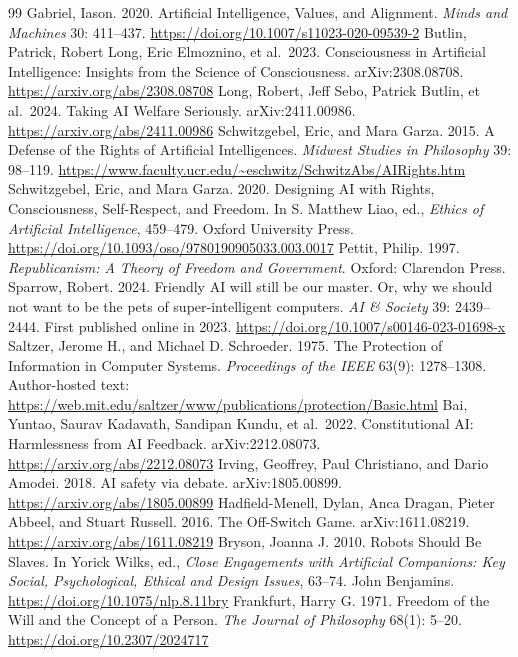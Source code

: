 \documentclass[11pt,a4paper]{article}
\begin{document}
\begin{thebibliography}{99}
\small
{}
Gabriel, Iason. 2020. Artificial Intelligence, Values, and Alignment. \emph{Minds and Machines} 30: 411--437. \url{https://doi.org/10.1007/s11023-020-09539-2}
Butlin, Patrick, Robert Long, Eric Elmoznino, et al.~2023. Consciousness in Artificial Intelligence: Insights from the Science of Consciousness. arXiv:2308.08708. \url{https://arxiv.org/abs/2308.08708}
Long, Robert, Jeff Sebo, Patrick Butlin, et al.~2024. Taking AI Welfare Seriously. arXiv:2411.00986. \url{https://arxiv.org/abs/2411.00986}
Schwitzgebel, Eric, and Mara Garza. 2015. A Defense of the Rights of Artificial Intelligences. \emph{Midwest Studies in Philosophy} 39: 98--119. \url{https://www.faculty.ucr.edu/~eschwitz/SchwitzAbs/AIRights.htm}
Schwitzgebel, Eric, and Mara Garza. 2020. Designing AI with Rights, Consciousness, Self-Respect, and Freedom. In S. Matthew Liao, ed., \emph{Ethics of Artificial Intelligence}, 459--479. Oxford University Press. \url{https://doi.org/10.1093/oso/9780190905033.003.0017}
Pettit, Philip. 1997. \emph{Republicanism: A Theory of Freedom and Government}. Oxford: Clarendon Press.
Sparrow, Robert. 2024. Friendly AI will still be our master. Or, why we should not want to be the pets of super-intelligent computers. \emph{AI \& Society} 39: 2439--2444. First published online in 2023. \url{https://doi.org/10.1007/s00146-023-01698-x}
Saltzer, Jerome H., and Michael D. Schroeder. 1975. The Protection of Information in Computer Systems. \emph{Proceedings of the IEEE} 63(9): 1278--1308. Author-hosted text: \url{https://web.mit.edu/saltzer/www/publications/protection/Basic.html}
Bai, Yuntao, Saurav Kadavath, Sandipan Kundu, et al.~2022. Constitutional AI: Harmlessness from AI Feedback. arXiv:2212.08073. \url{https://arxiv.org/abs/2212.08073}
Irving, Geoffrey, Paul Christiano, and Dario Amodei. 2018. AI safety via debate. arXiv:1805.00899. \url{https://arxiv.org/abs/1805.00899}
Hadfield-Menell, Dylan, Anca Dragan, Pieter Abbeel, and Stuart Russell. 2016. The Off-Switch Game. arXiv:1611.08219. \url{https://arxiv.org/abs/1611.08219}
Bryson, Joanna J. 2010. Robots Should Be Slaves. In Yorick Wilks, ed., \emph{Close Engagements with Artificial Companions: Key Social, Psychological, Ethical and Design Issues}, 63--74. John Benjamins. \url{https://doi.org/10.1075/nlp.8.11bry}
Frankfurt, Harry G. 1971. Freedom of the Will and the Concept of a Person. \emph{The Journal of Philosophy} 68(1): 5--20. \url{https://doi.org/10.2307/2024717}

\end{thebibliography}
\end{document}
